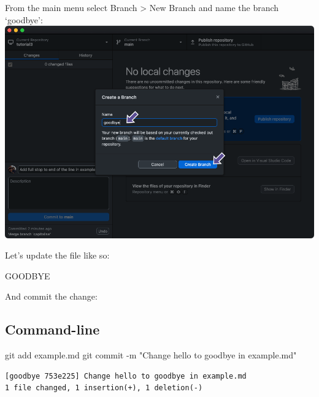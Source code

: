\documentclass[
  letterpaper,
  DIV=11,
  numbers=noendperiod]{scrartcl}
\newenvironment{Shaded}{\begin{snugshade}}{\end{snugshade}}
\newcommand{\AttributeTok}[1]{\textcolor[rgb]{0.40,0.45,0.13}{#1}}
\newcommand{\FunctionTok}[1]{\textcolor[rgb]{0.28,0.35,0.67}{#1}}
\newcommand{\NormalTok}[1]{\textcolor[rgb]{0.00,0.23,0.31}{#1}}
\newcommand{\StringTok}[1]{\textcolor[rgb]{0.13,0.47,0.30}{#1}}
\begin{document}
From the main menu select Branch \textgreater{} New Branch and name the
branch `goodbye': \includegraphics{images/image58.png}

Let's update the file like so:

\begin{tcolorbox}[enhanced jigsaw, coltitle=black, colback=white, colbacktitle=quarto-callout-note-color!10!white, breakable, bottomrule=.15mm, colframe=quarto-callout-note-color-frame, left=2mm, toptitle=1mm, leftrule=.75mm, toprule=.15mm, title=\textcolor{quarto-callout-note-color}{\faInfo}\hspace{0.5em}{example.md}, titlerule=0mm, arc=.35mm, bottomtitle=1mm, rightrule=.15mm, opacitybacktitle=0.6, opacityback=0]

GOODBYE

\end{tcolorbox}

And commit the change:

\subsection{Command-line}

\begin{Shaded}
\begin{Highlighting}[]
\FunctionTok{git}\NormalTok{ add example.md}
\FunctionTok{git}\NormalTok{ commit }\AttributeTok{{-}m} \StringTok{"Change hello to goodbye in example.md"}
\end{Highlighting}
\end{Shaded}

\begin{verbatim}
[goodbye 753e225] Change hello to goodbye in example.md
1 file changed, 1 insertion(+), 1 deletion(-)
\end{verbatim}
\end{document}
